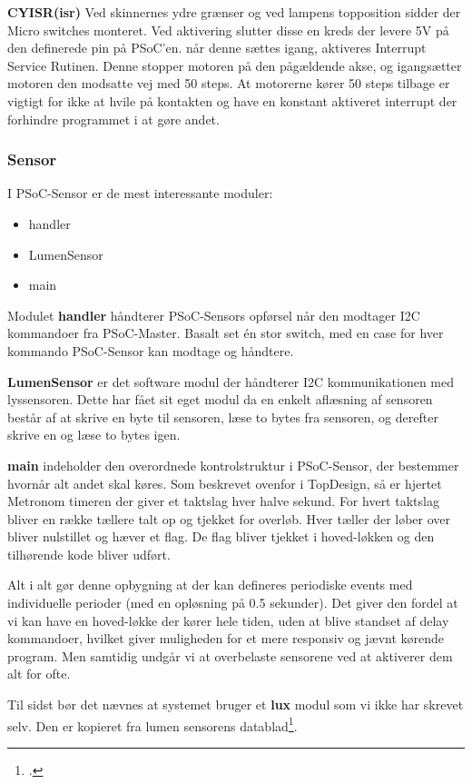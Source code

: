 \textbf{CY\textunderscore{}ISR(isr\textunderscore{})}\newline 
Ved skinnernes ydre grænser og ved lampens topposition sidder der Micro switches monteret. Ved aktivering slutter disse en kreds der levere 5V på den definerede pin på PSoC'en. når denne sættes igang, aktiveres Interrupt Service Rutinen. Denne stopper motoren på den pågældende akse, og igangsætter motoren den modsatte vej med 50 steps. At motorerne kører 50 steps tilbage er vigtigt for ikke at hvile på kontakten og have en konstant aktiveret interrupt der forhindre programmet i at gøre andet. 



\subsubsection{Sensor}

I PSoC-Sensor er de mest interessante moduler:

\begin{itemize}
	\item handler
	\item LumenSensor
	\item main
\end{itemize}

Modulet \textbf{handler} håndterer PSoC-Sensors opførsel når den modtager I2C kommandoer fra PSoC-Master. Basalt set én stor switch, med en case for hver kommando PSoC-Sensor kan modtage og håndtere.

\textbf{LumenSensor} er det software modul der håndterer I2C kommunikationen med lyssensoren. Dette har fået sit eget modul da en enkelt aflæsning af sensoren består af at skrive en byte til sensoren, læse to bytes fra sensoren, og derefter skrive en og læse to bytes igen.

 \textbf{main} indeholder den overordnede kontrolstruktur i PSoC-Sensor, der bestemmer hvornår alt andet skal køres. Som beskrevet ovenfor i TopDesign, så er hjertet Metronom timeren der giver et taktslag hver halve sekund. For hvert taktslag bliver en række tællere talt op og tjekket for overløb. Hver tæller der løber over bliver nulstillet og hæver et flag. De flag bliver tjekket i hoved-løkken og den tilhørende kode bliver udført.

Alt i alt gør denne opbygning at der kan defineres periodiske events med individuelle perioder (med en opløsning på 0.5 sekunder). Det giver den fordel at vi kan have en hoved-løkke der kører hele tiden, uden at blive standset af delay kommandoer, hvilket giver muligheden for et mere responsiv og jævnt kørende program. Men samtidig undgår vi at overbelaste sensorene ved at aktiverer dem alt for ofte.

Til sidst bør det nævnes at systemet bruger et \textbf{lux} modul som vi ikke har skrevet selv. Den er kopieret fra lumen sensorens datablad\footcite{TSL2561}.
